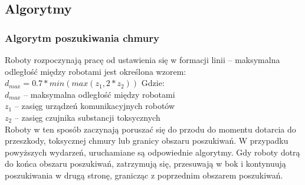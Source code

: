 \documentclass[a4paper, 12pt]{article}
\begin{document}
\subsection{Algorytmy}

\subsubsection{Algorytm poszukiwania chmury}
	Roboty rozpoczynają pracę od ustawienia się w formacji linii -- maksymalna odległość między robotami jest określona wzorem:
	\begin{math}
	d_{max} = 0.7*min(max(z_1,2*z_2))
	\end{math}
	Gdzie:\\
	$d_{max}$ -- maksymalna odległość między robotami\\
	$z_1$ -- zasięg urządzeń komunikacyjnych robotów\\
	$z_2$ -- zasięg czujnika substancji toksycznych\\
	Roboty w ten sposób zaczynają poruszać się do przodu do momentu dotarcia do przeszkody, toksycznej chmury lub granicy obszaru poszukiwań. W przypadku powyższych wydarzeń, uruchamiane są odpowiednie algorytmy.
	Gdy roboty dotrą do końca obszaru poszukiwań, zatrzymują się, przesuwają w bok i kontynuują poszukiwania w drugą stronę, granicząc z poprzednim obszarem poszukiwań.
\end{document}
